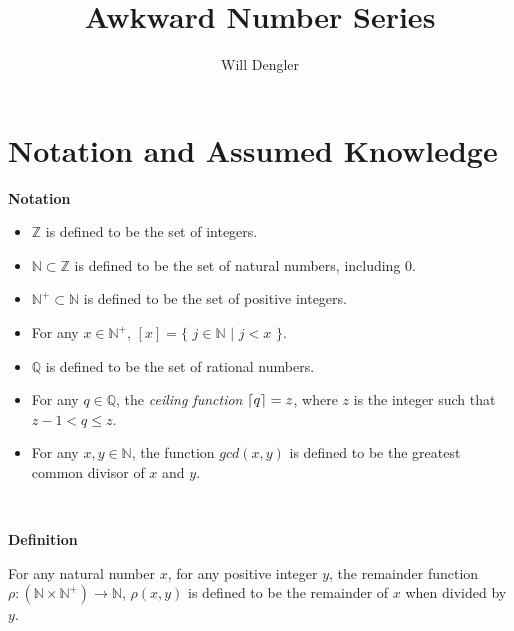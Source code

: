\documentclass[a4paper,12pt]{article}
\DeclarePairedDelimiter{\ceil}{\lceil}{\rceil}
\begin{document}
\title{Awkward Number Series}
\author{Will Dengler}
\maketitle

\section{Notation and Assumed Knowledge}
\label{section:notation_and_assumed_knowledge}


\label{definition:remainder_function}
\hypertarget{definition:remainder_function}{}
\begin{tcolorbox}
\textbf{Notation}

\begin{itemize}

\item $\mathbb{Z}$ is defined to be the set of integers.

\item $\mathbb{N} \subset \mathbb{Z}$ is defined to be the set of natural numbers, including $0$.

\item $\mathbb{N}^+ \subset \mathbb{N}$ is defined to be the set of positive integers.

\item For any $x \in \mathbb{N}^+$, $[x] = \{$ $j \in \mathbb{N}$ $|$ $j < x$ $\}$.

\item $\mathbb{Q}$ is defined to be the set of rational numbers.

\item For any $q \in \mathbb{Q}$, the \textit{ceiling function} $\ceil{q} = z$, where $z$ is the integer such that $z - 1 < q \leq z$.

\item For any $x, y \in \mathbb{N}$, the function $gcd(x, y)$ is defined to be the greatest common divisor of $x$ and $y$.
\end{itemize}
\end{tcolorbox}
\noindent \\








\label{definition:remainder_function}
\hypertarget{definition:remainder_function}{}
\begin{tcolorbox}
\textbf{Definition}

\noindent For any natural number $x$, for any positive integer $y$,  the remainder function $\rho : (\mathbb{N} \times \mathbb{N}^+) \rightarrow \mathbb{N}$, $\rho(x, y)$ is defined to be the remainder of $x$ when divided by $y$.
\end{tcolorbox}
\noindent \\
\end{document}
